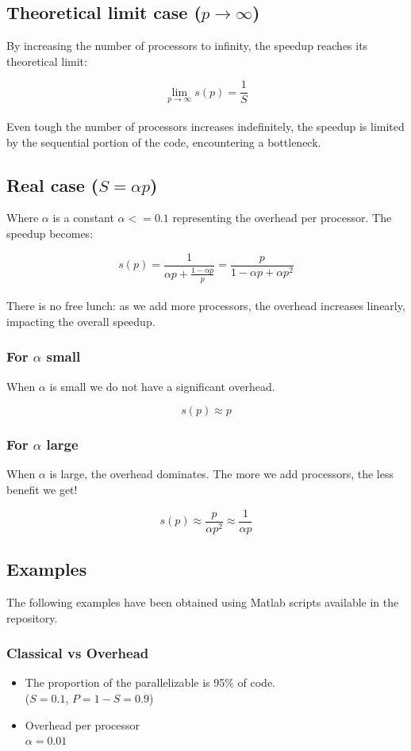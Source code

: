 \documentclass[a4paper,12pt]{article}
\begin{document}
\subsection{Theoretical limit case ($p \to \infty $)}
By increasing the number of processors to infinity, the speedup reaches its theoretical limit:

\[
\lim_{p \to \infty} s(p) = \frac{1}{S}
\]
\\
Even tough the number of processors increases indefinitely, the speedup is limited by the sequential portion of the code, encountering a bottleneck.


\subsection{Real case ($S=\alpha p$)}
Where $\alpha$ is a constant $\alpha <= 0.1$ representing the overhead per processor. The speedup becomes:

\[
s(p) = \frac{1}{\alpha p + \frac{1 - \alpha p}{p}} = \frac{p}{1 - \alpha p + \alpha p^2}
\]
\\
There is no free lunch: as we add more processors, the overhead increases linearly, impacting the overall speedup.

\subsubsection{For $\alpha$ small}
When $\alpha$ is small we do not have a significant overhead.

\[
s(p) \approx p
\]

\subsubsection{For $\alpha$ large}
When $\alpha$ is large, the overhead dominates. The more we add processors, the less benefit we get!

\[
s(p) \approx \frac{p}{\alpha p^2} \approx \frac{1}{\alpha p}
\]


\subsection{Examples}
The following examples have been obtained using Matlab scripts available in the repository.

\subsubsection*{Classical vs Overhead}
\begin{itemize}
    \item The proportion of the parallelizable is 95\% of code.\\
    ($S=0.1$, $P = 1-S = 0.9$)
    \item Overhead per processor\\
    $\alpha = 0.01$
\end{itemize}
\end{document}
